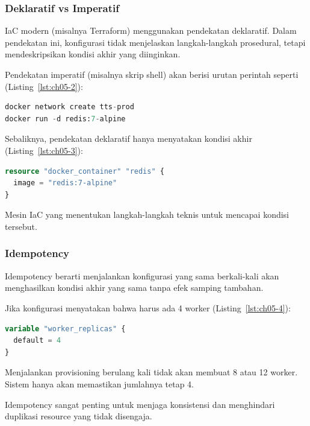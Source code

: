 \subsubsection*{Deklaratif vs Imperatif}

IaC modern (misalnya Terraform) menggunakan pendekatan deklaratif. Dalam pendekatan ini, konfigurasi tidak menjelaskan langkah-langkah prosedural, tetapi mendeskripsikan kondisi akhir yang diinginkan.

Pendekatan imperatif (misalnya skrip shell) akan berisi urutan perintah seperti (Listing~\ref{lst:ch05-2}):

\begin{lstlisting}[language=terraform, caption={Potongan kode Terraform pada Deklaratif vs Imperatif}, label={lst:ch05-2}]
docker network create tts-prod
docker run -d redis:7-alpine
\end{lstlisting}

Sebaliknya, pendekatan deklaratif hanya menyatakan kondisi akhir (Listing~\ref{lst:ch05-3}):

\begin{lstlisting}[language=terraform, caption={Potongan kode Terraform pada Deklaratif vs Imperatif (2)}, label={lst:ch05-3}]
resource "docker_container" "redis" {
  image = "redis:7-alpine"
}
\end{lstlisting}

Mesin IaC yang menentukan langkah-langkah teknis untuk mencapai kondisi tersebut.

\subsubsection*{Idempotency}

Idempotency berarti menjalankan konfigurasi yang sama berkali-kali akan menghasilkan kondisi akhir yang sama tanpa efek samping tambahan.

Jika konfigurasi menyatakan bahwa harus ada 4 worker (Listing~\ref{lst:ch05-4}):

\begin{lstlisting}[language=terraform, caption={Potongan kode Terraform pada Idempotency}, label={lst:ch05-4}]
variable "worker_replicas" {
  default = 4
}
\end{lstlisting}

Menjalankan provisioning berulang kali tidak akan membuat 8 atau 12 worker. Sistem hanya akan memastikan jumlahnya tetap 4.

Idempotency sangat penting untuk menjaga konsistensi dan menghindari duplikasi resource yang tidak disengaja.

